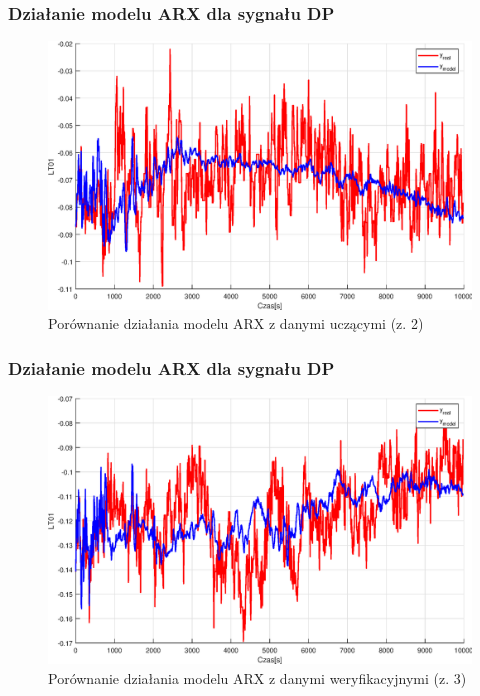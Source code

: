 \addtocounter{framenumber}{-1}
\begin{frame}
  \frametitle{Działanie modelu ARX dla sygnału DP}
  \begin{figure}[H]
    \centering
    \includegraphics[width=0.75\linewidth,keepaspectratio]{results_matlab/LT01_2.eps}
    \caption{Porównanie działania modelu ARX z danymi uczącymi (z. 2)}
    \label{fig:test}
    \end{figure}
\end{frame}

\addtocounter{framenumber}{-1}
\begin{frame}
  \frametitle{Działanie modelu ARX dla sygnału DP}
  \begin{figure}[H]
    \centering
    \includegraphics[width=0.75\linewidth,keepaspectratio]{results_matlab/LT01_3.eps}
    \caption{Porównanie działania modelu ARX z danymi weryfikacyjnymi (z. 3)}
    \label{fig:test}
    \end{figure}
\end{frame}

